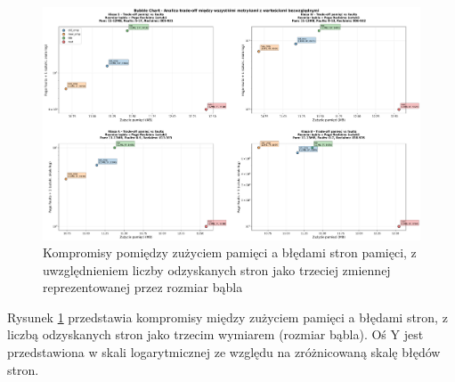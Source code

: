 \begin{figure}[H]
    \centering
    \includegraphics[width=\textwidth]{analiza/images/parallel/ep/arm/chart_06_bubble_chart.png}
    \caption{Kompromisy  pomiędzy zużyciem pamięci a błędami stron pamięci, z uwzględnieniem liczby odzyskanych stron jako trzeciej zmiennej reprezentowanej przez rozmiar bąbla}
    \label{ep_kompromisy_pamiec_bledy}
\end{figure}
Rysunek \ref{ep_kompromisy_pamiec_bledy} przedstawia kompromisy między zużyciem pamięci a błędami stron, z liczbą odzyskanych stron jako trzecim wymiarem (rozmiar bąbla). Oś Y jest przedstawiona w skali logarytmicznej ze względu na zróżnicowaną skalę błędów stron.


